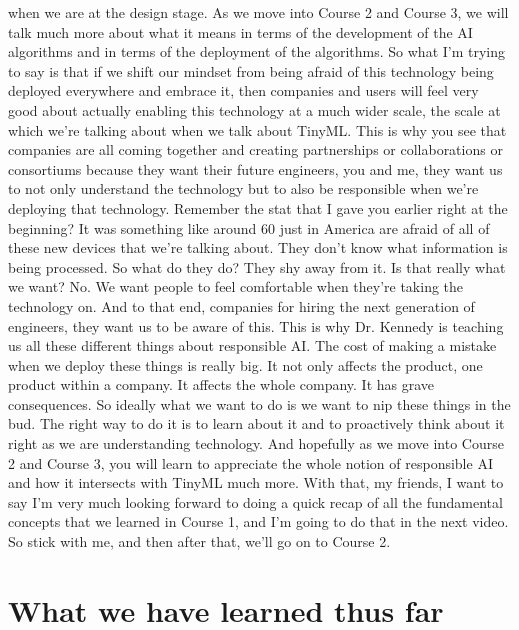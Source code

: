 when we are at the design stage.
As we move into Course 2 and Course 3, we
will talk much more about what it means in terms of the development of the AI
algorithms and in terms of the deployment of the algorithms.
So what I'm trying to say is that if we shift our mindset from being
afraid of this technology being deployed everywhere and embrace it,
then companies and users will feel very good about actually enabling
this technology at a much wider scale, the scale at which we're talking
about when we talk about TinyML.
This is why you see that companies are all coming together and creating
partnerships or collaborations or consortiums
because they want their future engineers,
you and me, they want us to not only understand the technology
but to also be responsible when we're deploying that technology.
Remember the stat that I gave you earlier right at the beginning?
It was something like around 60%
just in America are afraid of all of these new devices
that we're talking about.
They don't know what information is being processed.
So what do they do?
They shy away from it.
Is that really what we want?
No.
We want people to feel comfortable when they're taking the technology on.
And to that end, companies for hiring the next generation of engineers,
they want us to be aware of this.
This is why Dr. Kennedy is teaching us all these different things
about responsible AI.
The cost of making a mistake when we deploy these things is really big.
It not only affects the product, one product within a company.
It affects the whole company.
It has grave consequences.
So ideally what we want to do is we want to nip these things in the bud.
The right way to do it is to learn about it
and to proactively think about it right as we are understanding technology.
And hopefully as we move into Course 2 and Course 3,
you will learn to appreciate the whole notion of responsible AI
and how it intersects with TinyML much more.
With that, my friends, I want to say I'm very much looking forward
to doing a quick recap of all the fundamental concepts
that we learned in Course 1, and I'm going to do that in the next video.
So stick with me, and then after that, we'll go on to Course 2.


\section{What we have learned thus far}

